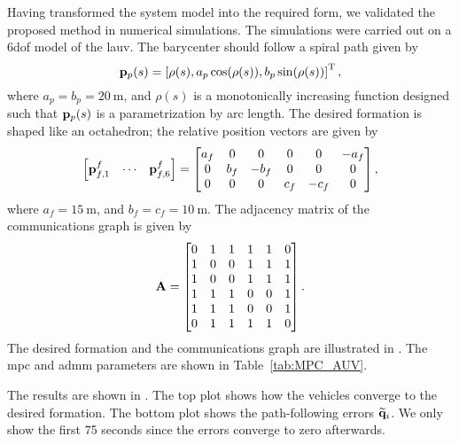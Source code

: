 Having transformed the system model into the required form, we validated the proposed method in numerical simulations.
The simulations were carried out on a 6\gls{dof} model of the \acrfull{lauv}.
The barycenter should follow a spiral path given by
\begin{equation}
    \mathbf{p}_p(s) = \left[\rho(s), a_p \cos(\rho(s)), b_p \sin(\rho(s))\right]^{\mathrm{T}},
\end{equation}
where $a_p = b_p = \SI{20}{\meter}$, and $\rho(s)$ is a monotonically increasing function designed such that $\mathbf{p}_p(s)$ is a parametrization by arc length.
The desired formation is shaped like an octahedron; the relative position vectors are given by
\begin{equation}
    \begin{bmatrix}
        \mathbf{p}_{f, 1}^f & \cdots & \mathbf{p}_{f, 6}^f
    \end{bmatrix}
    =
    \begin{bmatrix}
        a_f & 0 & 0 & 0 & 0 & -a_f\\ 
        0 & b_f & -b_f & 0 & 0 & 0\\ 
        0 & 0 & 0 & c_f & -c_f & 0
    \end{bmatrix},
\end{equation}
where $a_f = \SI{15}{\meter}$, and $b_f = c_f = \SI{10}{\meter}$.
The adjacency matrix of the communications graph is given by
\begin{equation}
    \mathbf{A} = 
    \begin{bmatrix}
        0 & 1 & 1 & 1 & 1 & 0\\ 1 & 0 & 0 & 1 & 1 & 1\\ 1 & 0 & 0 & 1 & 1 & 1\\ 1 & 1 & 1 & 0 & 0 & 1\\ 1 & 1 & 1 & 0 & 0 & 1\\ 0 & 1 & 1 & 1 & 1 & 0
    \end{bmatrix}.
\end{equation}
The desired formation and the communications graph are illustrated in .
The \gls{mpc} and \gls{admm} parameters are shown in Table~\ref{tab:MPC_AUV}.

The results are shown in .
The top plot shows how the vehicles converge to the desired formation.
The bottom plot shows the path-following errors $\widetilde{\mathbf{q}}_i$.
We only show the first 75 seconds since the errors converge to zero afterwards.



